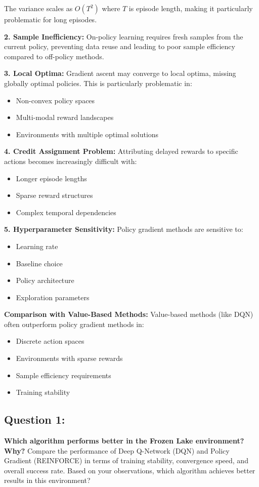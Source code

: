\documentclass[12pt]{article}
\begin{document}
{{{The variance scales as $O(T^2)$ where $T$ is episode length, making it particularly problematic for long episodes.

\textbf{2. Sample Inefficiency:}
On-policy learning requires fresh samples from the current policy, preventing data reuse and leading to poor sample efficiency compared to off-policy methods.

\textbf{3. Local Optima:}
Gradient ascent may converge to local optima, missing globally optimal policies. This is particularly problematic in:
\begin{itemize}
    \item Non-convex policy spaces
    \item Multi-modal reward landscapes
    \item Environments with multiple optimal solutions
\end{itemize}

\textbf{4. Credit Assignment Problem:}
Attributing delayed rewards to specific actions becomes increasingly difficult with:
\begin{itemize}
    \item Longer episode lengths
    \item Sparse reward structures
    \item Complex temporal dependencies
\end{itemize}

\textbf{5. Hyperparameter Sensitivity:}
Policy gradient methods are sensitive to:
\begin{itemize}
    \item Learning rate
    \item Baseline choice
    \item Policy architecture
    \item Exploration parameters
\end{itemize}

\textbf{Comparison with Value-Based Methods:}
Value-based methods (like DQN) often outperform policy gradient methods in:
\begin{itemize}
    \item Discrete action spaces
    \item Environments with sparse rewards
    \item Sample efficiency requirements
    \item Training stability
\end{itemize}

\subsection{Question 1:}
\textbf{Which algorithm performs better in the Frozen Lake environment? Why?}
\newline
Compare the performance of Deep Q-Network (DQN) and Policy Gradient (REINFORCE) in terms of training stability, convergence speed, and overall success rate. Based on your observations, which algorithm achieves better results in this environment?

}}}
\end{document}
